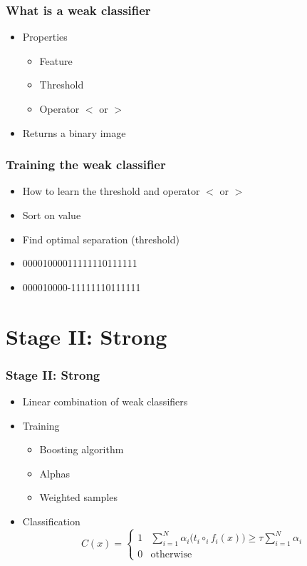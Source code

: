 \documentclass{beamer}
\begin{document}
\frame
{
  \frametitle{What is a weak classifier}
	\begin{itemize}
		\item <+-| alert@+> Properties
			\begin{itemize}
				\item <+-| alert@+> Feature
				\item <+-| alert@+> Threshold
				\item <+-| alert@+> Operator $<$ or $>$
			\end{itemize}
		\item <+-| alert@+> Returns a binary image
	\end{itemize}
}
\frame
{
  \frametitle{Training the weak classifier}
	\begin{itemize}
		\item <+-| alert@+> How to learn the threshold and operator $<$ or $>$
		\item <+-| alert@+> Sort on value
		\item <+-| alert@+> Find optimal separation (threshold)
		\item <+-| alert@+> 00001000011111110111111
		\item <+-| alert@+> 000010000-11111110111111
	\end{itemize}
}

\section{Stage II: Strong}
\frame
{
  \frametitle{Stage II: Strong}
	
  \begin{itemize}
  \item <+-| alert@+> Linear combination of weak classifiers
  \item <+-| alert@+> Training
  \begin{itemize}
  	\item Boosting algorithm
  	\item Alphas
  	\item Weighted samples
  \end{itemize}
  \item <+-| alert@+> Classification
	\begin{displaymath}
	C(x) = 
		\left\{ \begin{array}{ll}
			1 & \sum^N_{i=1} \alpha_i \big(t_i \circ_i f_i(x)\big) \ge \tau \sum^N_{i=1}\alpha_i \\
			0 & \textrm{otherwise}
		\end{array} \right.
	\end{displaymath}
  \end{itemize}
}
\end{document}
